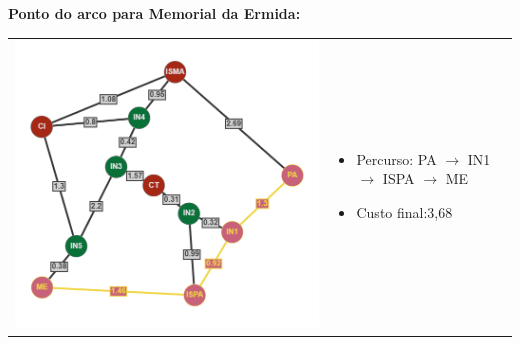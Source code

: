 \documentclass[12pt]{article}
\begin{document}
    \newpage
    \noindent \textbf{Ponto do arco para Memorial da Ermida:}\\
    \begin{tabular}{@{}m{}m{}@{}}
      \centering\includegraphics[scale=0.4]{anexos/PA-ME.png} &
      \begin{itemize}
        \item Percurso: PA $\rightarrow$ IN1 $\rightarrow$ ISPA $\rightarrow$ ME
        \item Custo final:3,68
      \end{itemize}
    \end{tabular} 
    
\end{document}
